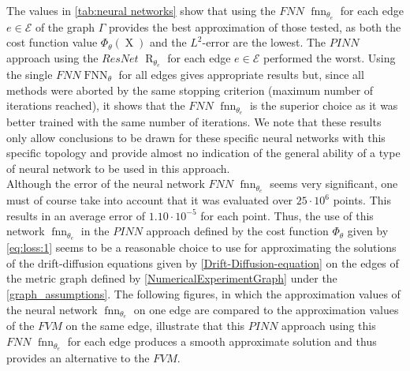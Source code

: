\begin{table}[H]
    \caption{The values of the cost function $\Phi_{\theta} \left( \operatorname{X} \right)$ and the $L^2$-Error with respect to the values generated by the $FVM$ method of the three different neural networks after the learning phase.}
    \label{tab:neural networks}
\end{table}

The values in \cref{tab:neural networks} show that using the $FNN$ $\operatorname{fnn}_{\theta_e}$ for each edge $e \in \mathcal{E}$ of the graph $\Gamma$ provides the best approximation of those tested, as both the cost function value $\Phi_{\theta} \left( \operatorname{X} \right)$ and the $L^2$-error are the lowest. The $PINN$ approach using the $ResNet$ $\operatorname{R}_{\theta_e}$ for each edge $e \in \mathcal{E}$ performed the worst. Using the single $FNN$$\operatorname{FNN}_{\theta}$ for all edges gives appropriate results but, since all methods were aborted by the same stopping criterion (maximum number of iterations reached), it shows that the $FNN$ $\operatorname{fnn}_{\theta_e}$ is the superior choice as it was better trained with the same number of iterations. We note that these results only allow conclusions to be drawn for these specific neural networks with this specific topology and provide almost no indication of the general ability of a type of neural network to be used in this approach.  \\
Although the error of the neural network $FNN$ $\operatorname{fnn}_{\theta_e}$ seems very significant, one must of course take into account that it was evaluated over $25 \cdot 10^{6}$ points. This results in an average error of $1.10 \cdot 10^{-5}$ for each point. Thus, the use of this network $\operatorname{fnn}_{\theta_e}$ in the $PINN$ approach defined by the cost function $\Phi_{\theta}$ given by \cref{eq:loss:1} seems to be a reasonable choice to use for approximating the solutions of the drift-diffusion equations given by \cref{Drift-Diffusion-equation} on the edges of the metric graph defined by \cref{NumericalExperimentGraph} under the \cref{graph_assumptions}. The following figures, in which the approximation values of the neural network $\operatorname{fnn}_{\theta_e}$ on one edge are compared to the approximation values of the $FVM$ on the same edge, illustrate that this $PINN$ approach using this $FNN$ $\operatorname{fnn}_{\theta_e}$ for each edge produces a smooth approximate solution and thus provides an alternative to the $FVM$. \\

